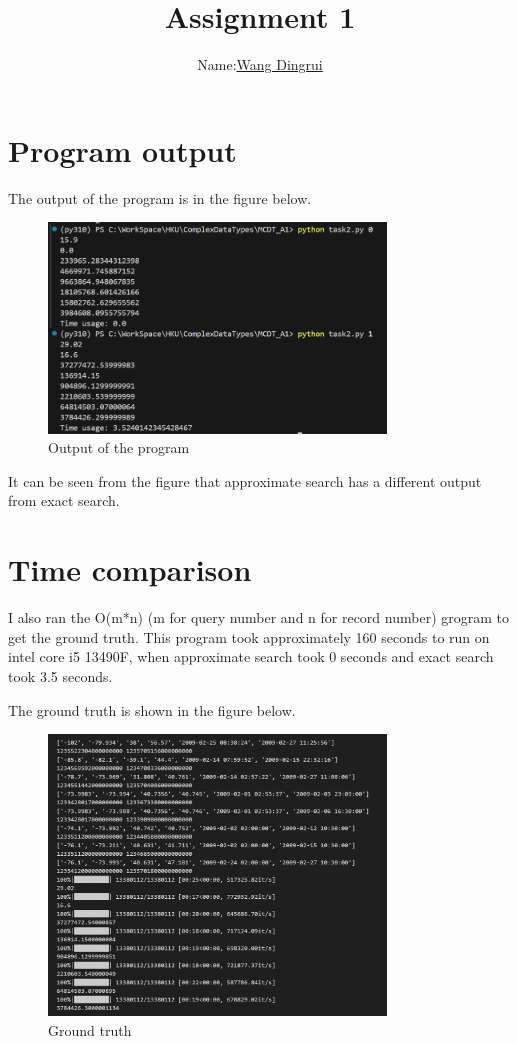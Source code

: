 \documentclass{article}
\begin{document}
\title{Assignment 1}
\author{
    Name:\underline{Wang Dingrui}
}
\maketitle


\section{Program output}
The output of the program is in the figure below. 
\begin{figure}[h]
    \centering
    \includegraphics[width=0.8\textwidth]{out.png} %
    \caption{Output of the program}
\end{figure}


It can be seen from the figure that approximate search has a different output from exact search.

\section{Time comparison}
I also ran the O(m*n) (m for query number and n for record number) grogram to get the ground truth. This program took approximately 160 seconds to run on intel core i5 13490F, when approximate search took 0 seconds and exact search took 3.5 seconds.

The ground truth is shown in the figure below.
\begin{figure}[h]
    \centering
    \includegraphics[width=0.8\textwidth]{gt.png} %
    \caption{Ground truth}
\end{figure}
\end{document}
